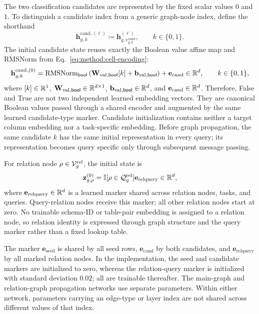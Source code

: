 The two classification candidates are represented by the fixed scalar
values \(0\) and \(1\). To distinguish a candidate index from a generic
graph-node index, define the shorthand
\begin{equation}
  \mathbf h_{g,k}^{\mathrm{cand},(\ell)}
  \coloneqq
  \mathbf h_{g,v_{g,k}^{\mathrm{cand}}}^{(\ell)},
  \qquad k\in\{0,1\}.
\label{eq:method:candidate-state-shorthand}
\end{equation}
The initial candidate state reuses exactly the Boolean value affine map and
RMSNorm from Eq.~\eqref{eq:method:cell-encoding}:
\begin{equation}
  \mathbf h_{g,k}^{\mathrm{cand},(0)}
  =
  \operatorname{RMSNorm}_{\mathsf{bool}}
  \left(
    \mathbf W_{\mathrm{val},\mathsf{bool}}[k]
    +\mathbf b_{\mathrm{val},\mathsf{bool}}
  \right)
  +\mathbf e_{\mathrm{cand}}
  \in\mathbb{R}^d,
  \qquad k\in\{0,1\},
\label{eq:method:candidate-initialization}
\end{equation}
where \([k]\in\mathbb{R}^1\),
\(\mathbf W_{\mathrm{val},\mathsf{bool}}\in\mathbb{R}^{d\times1}\),
\(\mathbf b_{\mathrm{val},\mathsf{bool}}\in\mathbb{R}^d\), and
\(\mathbf e_{\mathrm{cand}}\in\mathbb{R}^d\). Therefore, False and True are not
two independent learned embedding vectors. They are canonical Boolean
values passed through a shared encoder and augmented by the same learned
candidate-type marker. Candidate initialization contains neither a target
column embedding nor a task-specific embedding. Before graph propagation,
the same candidate \(k\) has the same initial representation in every
query; its representation becomes query specific only through subsequent
message passing.

For relation node \(\rho\in\mathcal V_g^{\mathrm{rel}}\), the initial state is
\begin{equation}
  \mathbf z_{g,\rho}^{(0)}
  =
  \mathbb{I}[\rho\in\mathcal Q_g^{\mathrm{rel}}]
  \mathbf e_{\mathrm{relquery}}
  \in\mathbb{R}^d,
\label{eq:method:relation-initialization}
\end{equation}
where \(\mathbf e_{\mathrm{relquery}}\in\mathbb{R}^d\) is a learned marker shared
across relation nodes, tasks, and queries. Query-relation nodes receive this
marker; all other relation nodes start at zero. No trainable schema-ID or
table-pair embedding is assigned to a relation node, so relation identity is
expressed through graph structure and the query marker rather than a fixed
lookup table.

The marker \(\mathbf e_{\mathrm{seed}}\) is shared by all seed rows,
\(\mathbf e_{\mathrm{cand}}\) by both candidates, and
\(\mathbf e_{\mathrm{relquery}}\) by all marked relation nodes. In the
implementation, the seed and candidate markers are initialized to zero,
whereas the relation-query marker is initialized with standard deviation
\(0.02\); all are trainable thereafter. The main-graph and relation-graph
propagation networks use separate parameters. Within either network,
parameters carrying an edge-type or layer index are not shared across
different values of that index.

